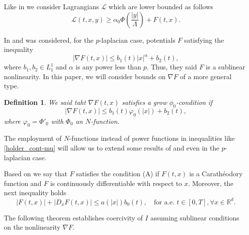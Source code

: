 \documentclass[twoside]{article}
\newtheorem{defi}[thm]{Definition}
\theoremstyle{remark}
\newcommand{\rr}{\mathbb{R}}
\renewcommand{\leq}{\leqslant}
\renewcommand{\geq}{\geqslant}
\begin{document}
Like in \cite{ABGMS2015} we consider Lagrangians $\mathcal{L}$ which are lower bounded as follows 
\begin{equation}\label{cota_inf}
\mathcal{L}(t,x,y)\geq \alpha_0\Phi\left(\frac{|y|}{\Lambda}\right)+ F(t,x).
\end{equation}

In \cite{tang1998periodic} and \cite{tang2010periodic} was considered, for the $p$-laplacian case, potentials $F$ satisfying the inequality
\[ |\nabla F(t,x)|\leq b_1(t)|x|^{\alpha}+b_2(t),\]
where  $b_1,b_2 \in L^1_1$ and $\alpha$ is any power less than $p$. Thus, they said $F$ is a sublinear nonlinearity. In this paper, we will consider bounds on $\nabla F$ of a more general type.

\begin{defi} We said taht $\nabla F(t,x)$ satisfies a \emph{grow $\phi_0$-condition} if
\begin{equation}\label{holder_cont-mu}
  \left| \nabla F(t,x) \right|\leq b_1(t)\varphi_0(|x|)+b_2(t),
\end{equation}
where $\varphi_0=\Phi'_0$ with $\Phi_0$ an $N$-function.

\end{defi}
The employment of  $N$-functions instead of power functions in  inequalities like  \eqref{holder_cont-mu}  will allow us to extend some results of   \cite{tang1998periodic} and \cite{tang2010periodic} even in the $p$-laplacian case.


Based on \cite{mawhin2010critical} we say that $F$ satisfies the condition (A) if  $F(t,x)$ is a Carath\'eo\-dory function and  $F$ is continuously differentiable with respect to $x$. Moreover, the next inequality holds
\begin{equation}\label{condA2}|F(t,x)|+ |D_{x}F(t,x)|\leq a(|x|)b_0(t),\quad\text{for a.e. }t\in [0,T], \forall x\in\rr^d.
\end{equation}

The following theorem establishes  coercivity of $I$ assuming sublinear conditions on the nonlinearity  $\nabla F$. 
\end{document}

